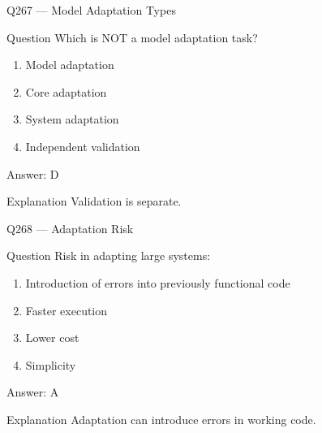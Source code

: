 \documentclass[aspectratio=169,8pt]{beamer}
\begin{document}
								\begin{frame}{Q267 --- Model Adaptation Types}
									\begin{block}{Question}
										Which is NOT a model adaptation task?
										\begin{enumerate}
											\item Model adaptation
											\item Core adaptation
											\item System adaptation
											\item Independent validation
										\end{enumerate}
									\end{block}
									\begin{exampleblock}{Answer: D}\end{exampleblock}
									\begin{block}{Explanation}
										Validation is separate.
									\end{block}
								\end{frame}
								
								\begin{frame}{Q268 --- Adaptation Risk}
									\begin{block}{Question}
										Risk in adapting large systems:
										\begin{enumerate}
											\item Introduction of errors into previously functional code
											\item Faster execution
											\item Lower cost
											\item Simplicity
										\end{enumerate}
									\end{block}
									\begin{exampleblock}{Answer: A}\end{exampleblock}
									\begin{block}{Explanation}
										Adaptation can introduce errors in working code.
									\end{block}
								\end{frame}
								
\end{document}
